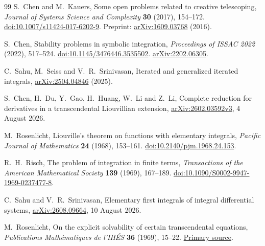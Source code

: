 \documentclass[11pt,a4paper]{article}
\theoremstyle{definition}
\theoremstyle{remark}
\numberwithin{equation}{section}
\begin{document}
\begin{thebibliography}{99}
S.~Chen and M.~Kauers,
Some open problems related to creative telescoping,
\emph{Journal of Systems Science and Complexity} \textbf{30} (2017),
154--172.
\href{https://doi.org/10.1007/s11424-017-6202-9}{doi:10.1007/s11424-017-6202-9}.
Preprint: \href{https://arxiv.org/abs/1609.03768}{arXiv:1609.03768} (2016).

S.~Chen,
Stability problems in symbolic integration,
\emph{Proceedings of ISSAC 2022} (2022), 517--524.
\href{https://doi.org/10.1145/3476446.3535502}{doi:10.1145/3476446.3535502}.
\href{https://arxiv.org/abs/2202.06305}{arXiv:2202.06305}.

C.~Sahu, M.~Seiss and V.~R.~Srinivasan,
Iterated and generalized iterated integrals,
\href{https://arxiv.org/abs/2504.04846}{arXiv:2504.04846} (2025).

S.~Chen, H.~Du, Y.~Gao, H.~Huang, W.~Li and Z.~Li,
Complete reduction for derivatives in a transcendental Liouvillian extension,
\href{https://arxiv.org/abs/2602.03592}{arXiv:2602.03592v3},
4 August 2026.

M.~Rosenlicht,
Liouville's theorem on functions with elementary integrals,
\emph{Pacific Journal of Mathematics} \textbf{24} (1968), 153--161.
\href{https://doi.org/10.2140/pjm.1968.24.153}{doi:10.2140/pjm.1968.24.153}.

R.~H.~Risch,
The problem of integration in finite terms,
\emph{Transactions of the American Mathematical Society}
\textbf{139} (1969), 167--189.
\href{https://doi.org/10.1090/S0002-9947-1969-0237477-8}{doi:10.1090/S0002-9947-1969-0237477-8}.

C.~Sahu and V.~R.~Srinivasan,
Elementary first integrals of integral differential systems,
\href{https://arxiv.org/abs/2608.09664}{arXiv:2608.09664},
10 August 2026.


M.~Rosenlicht,
On the explicit solvability of certain transcendental equations,
\emph{Publications Math\'ematiques de l'IH\'ES} \textbf{36}
(1969), 15--22.
\href{https://www.numdam.org/item/PMIHES_1969__36__15_0/}{Primary source}.


\end{thebibliography}
\end{document}
